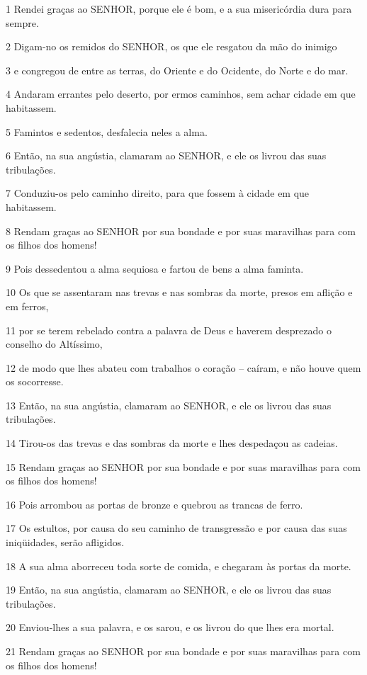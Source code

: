 \par 1 Rendei graças ao SENHOR, porque ele é bom, e a sua misericórdia dura para sempre.
\par 2 Digam-no os remidos do SENHOR, os que ele resgatou da mão do inimigo
\par 3 e congregou de entre as terras, do Oriente e do Ocidente, do Norte e do mar.
\par 4 Andaram errantes pelo deserto, por ermos caminhos, sem achar cidade em que habitassem.
\par 5 Famintos e sedentos, desfalecia neles a alma.
\par 6 Então, na sua angústia, clamaram ao SENHOR, e ele os livrou das suas tribulações.
\par 7 Conduziu-os pelo caminho direito, para que fossem à cidade em que habitassem.
\par 8 Rendam graças ao SENHOR por sua bondade e por suas maravilhas para com os filhos dos homens!
\par 9 Pois dessedentou a alma sequiosa e fartou de bens a alma faminta.
\par 10 Os que se assentaram nas trevas e nas sombras da morte, presos em aflição e em ferros,
\par 11 por se terem rebelado contra a palavra de Deus e haverem desprezado o conselho do Altíssimo,
\par 12 de modo que lhes abateu com trabalhos o coração -- caíram, e não houve quem os socorresse.
\par 13 Então, na sua angústia, clamaram ao SENHOR, e ele os livrou das suas tribulações.
\par 14 Tirou-os das trevas e das sombras da morte e lhes despedaçou as cadeias.
\par 15 Rendam graças ao SENHOR por sua bondade e por suas maravilhas para com os filhos dos homens!
\par 16 Pois arrombou as portas de bronze e quebrou as trancas de ferro.
\par 17 Os estultos, por causa do seu caminho de transgressão e por causa das suas iniqüidades, serão afligidos.
\par 18 A sua alma aborreceu toda sorte de comida, e chegaram às portas da morte.
\par 19 Então, na sua angústia, clamaram ao SENHOR, e ele os livrou das suas tribulações.
\par 20 Enviou-lhes a sua palavra, e os sarou, e os livrou do que lhes era mortal.
\par 21 Rendam graças ao SENHOR por sua bondade e por suas maravilhas para com os filhos dos homens!

